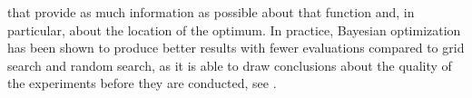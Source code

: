 that provide as much information as possible about that function and, in particular, about the location of the optimum. In practice, Bayesian optimization has been shown to produce better results with fewer evaluations compared to grid search and random search, as it is able to draw conclusions about the quality of the experiments before they are conducted, see \cite{SnoekLarochelleAdams:2012}.







